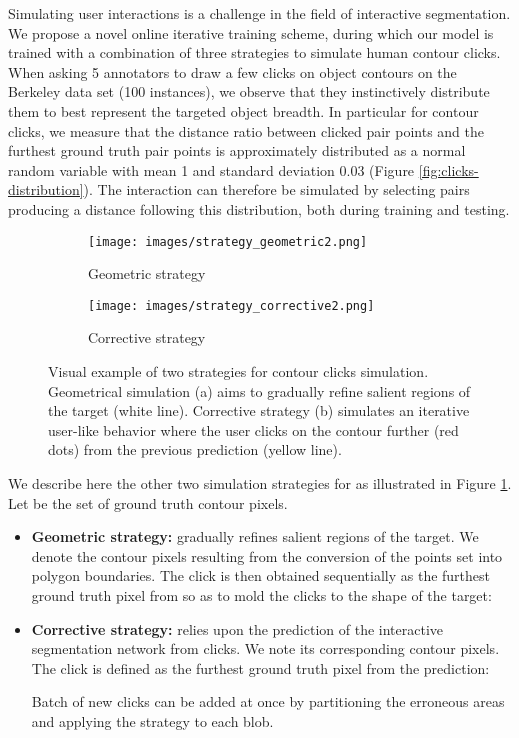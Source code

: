 \documentclass[letterpaper, 10 pt, conference]{ieeeconf}
\begin{document}
Simulating user interactions is a challenge in the field of interactive segmentation. We propose a novel online iterative training scheme, during which our model is trained with a combination of three strategies to simulate human contour clicks. 
When asking 5 annotators to draw a few clicks on object contours on the Berkeley data set (100 instances), we observe that they instinctively distribute them to best represent the targeted object breadth. In particular for  contour clicks, we measure that the distance ratio between clicked pair points and the furthest ground truth pair points is approximately distributed as a normal random variable with mean 1 and standard deviation 0.03 (Figure \ref{fig:clicks-distribution}). The interaction can therefore be simulated by selecting pairs producing a distance following this distribution, both during training and testing.\\

\begin{figure}
    \centering
    \begin{subfigure}{.49\linewidth}
        \centering
        \texttt{[image: images/strategy\_geometric2.png]}
        \caption{Geometric strategy}
    \end{subfigure}
    \begin{subfigure}{.49\linewidth}
        \centering
        \texttt{[image: images/strategy\_corrective2.png]}
        \caption{Corrective strategy}
    \end{subfigure}
     \caption{Visual example of two strategies for contour clicks simulation. Geometrical simulation (a) aims to gradually refine salient regions of the target (white line). Corrective strategy (b) simulates an iterative user-like behavior where the user clicks on the contour further (red dots) from the previous prediction (yellow line).
     }
    \label{fig:strategies}
\end{figure}

We describe here the other two simulation strategies for  as illustrated in Figure \ref{fig:strategies}. Let  be the set of ground truth contour pixels.
\begin{itemize}
  \item \textbf{Geometric strategy:} gradually refines salient regions of the target. We denote  the contour pixels resulting from the conversion of the  points set into polygon boundaries. The  click is then obtained sequentially as the furthest ground truth pixel from  so as to mold the clicks to the shape of the target:
  
  \item \textbf{Corrective strategy:} relies upon the prediction of the interactive segmentation network from  clicks. We note  its corresponding contour pixels. The  click is defined as the furthest ground truth pixel from the prediction:
  
  Batch of  new clicks can be added at once by partitioning the erroneous areas and applying the strategy to each blob.
\end{itemize}
\end{document}
